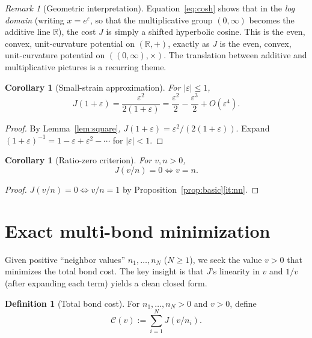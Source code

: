 \documentclass[11pt]{amsart}
\newtheorem{corollary}[theorem]{Corollary}
\theoremstyle{definition}
\newtheorem{definition}[theorem]{Definition}
\theoremstyle{remark}
\newtheorem{remark}[theorem]{Remark}
\newcommand{\R}{\mathbb{R}}
\begin{document}
\begin{remark}[Geometric interpretation]\label{rem:geom}
Equation~\eqref{eq:cosh} shows that in the \emph{log domain}
(writing $x=e^\varepsilon$, so that the multiplicative group $(0,\infty)$
becomes the additive line $\R$), the cost $J$ is simply a shifted
hyperbolic cosine.  This is the even, convex, unit-curvature potential
on $(\R,+)$, exactly as $J$ is the even, convex, unit-curvature potential
on $((0,\infty),\times)$.  The translation between additive and
multiplicative pictures is a recurring theme.
\end{remark}

\begin{corollary}[Small-strain approximation]\label{cor:small}
For $|\varepsilon|\le1$,
\[
J(1+\varepsilon)=\frac{\varepsilon^2}{2(1+\varepsilon)}
=\frac{\varepsilon^2}{2}-\frac{\varepsilon^3}{2}+O(\varepsilon^4).
\]
\end{corollary}
\begin{proof}
By Lemma~\ref{lem:square}, $J(1+\varepsilon)=\varepsilon^2/(2(1+\varepsilon))$.
Expand $(1+\varepsilon)^{-1}=1-\varepsilon+\varepsilon^2-\cdots$ for $|\varepsilon|<1$.
\end{proof}

\begin{corollary}[Ratio-zero criterion]\label{cor:ratio-zero}
For $v,n>0$,
\[
J(v/n)=0 \iff v=n.
\]
\end{corollary}
\begin{proof}
$J(v/n)=0\iff v/n=1$ by Proposition~\ref{prop:basic}\ref{it:nn}.
\end{proof}

\section{Exact multi-bond minimization}\label{sec:minimization}

Given positive ``neighbor values'' $n_1,\dots,n_N$ ($N\ge1$), we seek the
value $v>0$ that minimizes the total bond cost.  The key insight is that
$J$'s linearity in $v$ and $1/v$ (after expanding each term) yields a
clean closed form.

\begin{definition}[Total bond cost]\label{def:total}
For $n_1,\dots,n_N>0$ and $v>0$, define
\[
\mathcal C(v):=\sum_{i=1}^N J(v/n_i).
\]
\end{definition}
\end{document}
